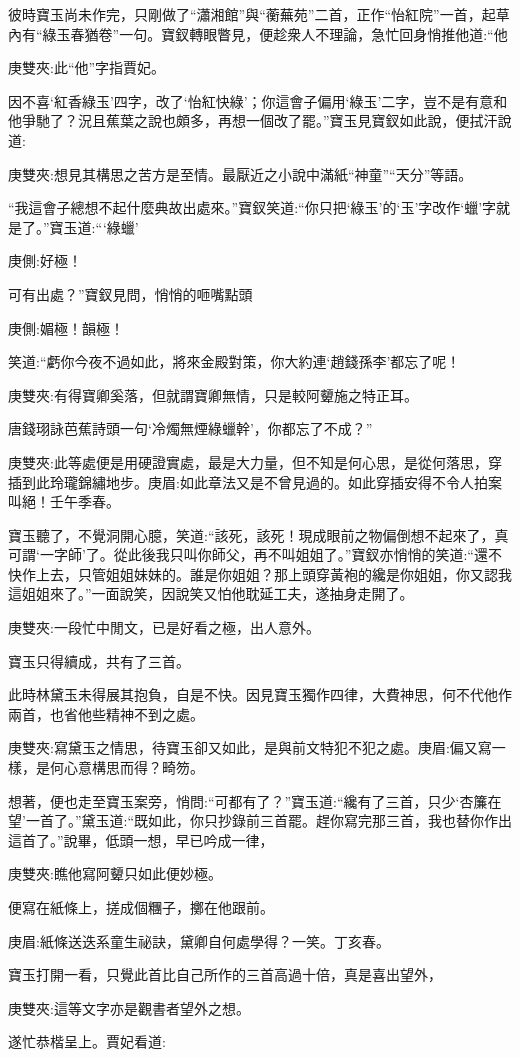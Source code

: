\begin{parag}
    彼時寶玉尚未作完，只剛做了“瀟湘館”與“蘅蕪苑”二首，正作“怡紅院”一首，起草內有“綠玉春猶卷”一句。寶釵轉眼瞥見，便趁衆人不理論，急忙回身悄推他道:“他\begin{note}庚雙夾:此“他”字指賈妃。\end{note}因不喜‘紅香綠玉’四字，改了‘怡紅快綠’；你這會子偏用‘綠玉’二字，豈不是有意和他爭馳了？況且蕉葉之說也頗多，再想一個改了罷。”寶玉見寶釵如此說，便拭汗說道:\begin{note}庚雙夾:想見其構思之苦方是至情。最厭近之小說中滿紙“神童”“天分”等語。\end{note}“我這會子總想不起什麼典故出處來。”寶釵笑道:“你只把‘綠玉’的‘玉’字改作‘蠟’字就是了。”寶玉道:“‘綠蠟’\begin{note}庚側:好極！\end{note}可有出處？”寶釵見問，悄悄的咂嘴點頭\begin{note}庚側:媚極！韻極！\end{note}笑道:“虧你今夜不過如此，將來金殿對策，你大約連‘趙錢孫李’都忘了呢！\begin{note}庚雙夾:有得寶卿奚落，但就謂寶卿無情，只是較阿顰施之特正耳。\end{note}唐錢珝詠芭蕉詩頭一句‘冷燭無煙綠蠟幹’，你都忘了不成？”\begin{note}庚雙夾:此等處便是用硬證實處，最是大力量，但不知是何心思，是從何落思，穿插到此玲瓏錦繡地步。庚眉:如此章法又是不曾見過的。如此穿插安得不令人拍案叫絕！壬午季春。\end{note}寶玉聽了，不覺洞開心臆，笑道:“該死，該死！現成眼前之物偏倒想不起來了，真可謂‘一字師’了。從此後我只叫你師父，再不叫姐姐了。”寶釵亦悄悄的笑道:“還不快作上去，只管姐姐妹妹的。誰是你姐姐？那上頭穿黃袍的纔是你姐姐，你又認我這姐姐來了。”一面說笑，因說笑又怕他耽延工夫，遂抽身走開了。\begin{note}庚雙夾:一段忙中閒文，已是好看之極，出人意外。\end{note}寶玉只得續成，共有了三首。
\end{parag}


\begin{parag}
    此時林黛玉未得展其抱負，自是不快。因見寶玉獨作四律，大費神思，何不代他作兩首，也省他些精神不到之處。\begin{note}庚雙夾:寫黛玉之情思，待寶玉卻又如此，是與前文特犯不犯之處。庚眉:偏又寫一樣，是何心意構思而得？畸笏。\end{note}想著，便也走至寶玉案旁，悄問:“可都有了？”寶玉道:“纔有了三首，只少‘杏簾在望’一首了。”黛玉道:“既如此，你只抄錄前三首罷。趕你寫完那三首，我也替你作出這首了。”說畢，低頭一想，早已吟成一律，\begin{note}庚雙夾:瞧他寫阿顰只如此便妙極。\end{note}便寫在紙條上，搓成個糰子，擲在他跟前。\begin{note}庚眉:紙條送迭系童生祕訣，黛卿自何處學得？一笑。丁亥春。\end{note}寶玉打開一看，只覺此首比自己所作的三首高過十倍，真是喜出望外，\begin{note}庚雙夾:這等文字亦是觀書者望外之想。\end{note}遂忙恭楷呈上。賈妃看道:
\end{parag}


